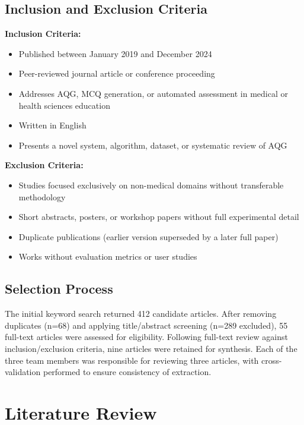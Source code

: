 \documentclass[conference]{IEEEtran}
\begin{document}
\subsection{Inclusion and Exclusion Criteria}

\textbf{Inclusion Criteria:}
\begin{itemize}
    \item Published between January 2019 and December 2024
    \item Peer-reviewed journal article or conference proceeding
    \item Addresses AQG, MCQ generation, or automated assessment in medical or health sciences education
    \item Written in English
    \item Presents a novel system, algorithm, dataset, or systematic review of AQG
\end{itemize}

\textbf{Exclusion Criteria:}
\begin{itemize}
    \item Studies focused exclusively on non-medical domains without transferable methodology
    \item Short abstracts, posters, or workshop papers without full experimental detail
    \item Duplicate publications (earlier version superseded by a later full paper)
    \item Works without evaluation metrics or user studies
\end{itemize}

\subsection{Selection Process}

The initial keyword search returned 412 candidate articles. After removing duplicates (n=68) and applying title/abstract screening (n=289 excluded), 55 full-text articles were assessed for eligibility. Following full-text review against inclusion/exclusion criteria, nine articles were retained for synthesis. Each of the three team members was responsible for reviewing three articles, with cross-validation performed to ensure consistency of extraction.

\section{Literature Review}
\label{sec:review}
\end{document}
